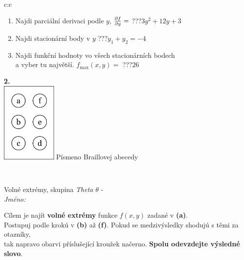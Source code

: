 \documentclass[10pt]{report}
\begin{document}
\begin{tabular}{c:c}
\begin{minipage}[c][104.5mm][t]{0.5\linewidth}
\begin{center}
\begin{minipage}{0.79\linewidth}
\begin{center}
\begin{varwidth}{\linewidth}
\begin{enumerate}
\item Najdi parciální derivaci podle $y$, $\pdv{f}{y}=$\quad \dotfill\; ???\;\dotfill \quad $3y^2+12y+3$
\item Najdi stacionární body v $y$\quad \dotfill\; ???\;\dotfill \quad $y_1+y_2=-4$
\item Najdi funkční hodnoty vo všech stacionárních bodech \\ \phantom{xxxxxx} a vyber tu najvětší. $f_{\text{max}}(x,y)=$\quad \dotfill\; ???\;\dotfill \quad $26$
\end{enumerate}
\end{varwidth}
\end{center}
\end{minipage}
\begin{minipage}{0.20\linewidth}
\begin{center}
{\Huge\bfseries 2.} \\[2mm]
\includegraphics[height=40mm]{../images/braille.png}
{\small Písmeno Braillovej abecedy}
\end{center}
\end{minipage}
\end{center}
\end{minipage}
\\ \hdashline
\begin{minipage}[c][104.5mm][t]{0.5\linewidth}
\begin{center}
\vspace{7mm}
{\huge Volné extrémy, skupina \textit{Theta $\theta$} -}\\[5mm]
\textit{Jméno:}\phantom{xxxxxxxxxxxxxxxxxxxxxxxxxxxxxxxxxxxxxxxxxxxxxxxxxxxxxxxxxxxxxxxxx}\\[5mm]
\begin{minipage}{0.95\linewidth}
\begin{center}
Cílem je najít \textbf{volné extrémy} funkce $f(x,y)$ zadané v \textbf{(a)}.\\Postupuj podle krokú v \textbf{(b)} až \textbf{(f)}. Pokud se medzivýsledky shodujú s těmi za otazníky,\\tak napravo obarvi příslušející kroužek načerno. \textbf{Spolu odevzdejte výsledné slovo}.

\end{center}
\end{minipage}
\end{center}
\end{minipage}
\end{tabular}
\end{document}
